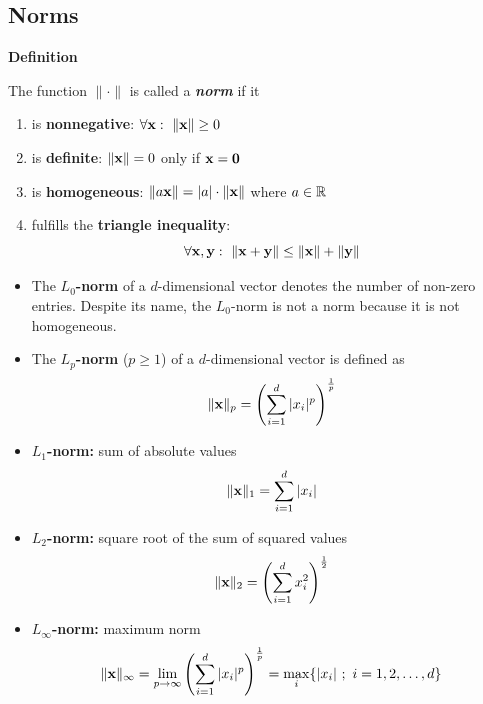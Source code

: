\subsection{Norms}
 \textbf{Definition}

    The function $\lVert\cdot\rVert$ %
    is called a \textbf{\emph{norm}} if it 
   
    \begin{enumerate}
      \item is \textbf{nonnegative}: $\forall \bm{\mathrm{x}}:~ \lVert\bm{\mathrm{x}}\rVert\geq 0$ 
      \item is \textbf{definite}: $\|\bm{\mathrm{x}}\| =0$ only if $\bm{\mathrm{x}}=\bm{\mathrm{0}}$ 
      \item is \textbf{homogeneous}: $\| a\bm{\mathrm{x}}\|= |a|\cdot \|\bm{\mathrm{x}}\|$ where $a\in \mathbb{R}$ 
      \item fulfills the \textbf{triangle inequality}:
      \begin{displaymath}
        \forall \bm{\mathrm{x}}, \bm{\mathrm{y}}:~\|\bm{\mathrm{x}}+\bm{\mathrm{y}}\| \leq \|\bm{\mathrm{x}}\|+ \|\bm{\mathrm{y}}\|
      \end{displaymath}
    \end{enumerate}
    \begin{itemize}
      \item The \textbf{$L_0$-norm} of a $d$-dimensional vector denotes the number of    non-zero entries. Despite its name, the $L_0$-norm is not a norm because it is not homogeneous.
      \item The \textbf{$L_p$-norm} ($p \geq 1$) of a $d$-dimensional vector is defined as 
        \begin{displaymath}
          \| \bm{\mathrm{x}}\|_p = \left( \sum_{i=1}^d  |x_i|^p \right)^{\frac{1}{p}}
        \end{displaymath}
    \item \textbf{$L_1$-norm:} sum of absolute values
      \begin{displaymath}
        \| \bm{\mathrm{x}}\|_1 = \sum_{i=1}^d |x_i|
      \end{displaymath}
    
    \item \textbf{$L_2$-norm:} square root of the sum of squared values
      \begin{displaymath}
        \| \bm{\mathrm{x}}\|_2 = \left(\sum_{i=1}^d x_i^2\right)^{\frac{1}{2}}
      \end{displaymath}
    \item \textbf{$L_\infty$-norm:} maximum norm
      \begin{displaymath}
        \| \bm{\mathrm{x}}\|_\infty = 
        \lim_{p\rightarrow \infty} \left( \sum_{i=1}^d  |x_i|^p \right)^{\frac{1}{p}} =
        \max_i \{ |x_i| \ ; \ i=1,2, \dots, d \}
      \end{displaymath}
  \end{itemize}
